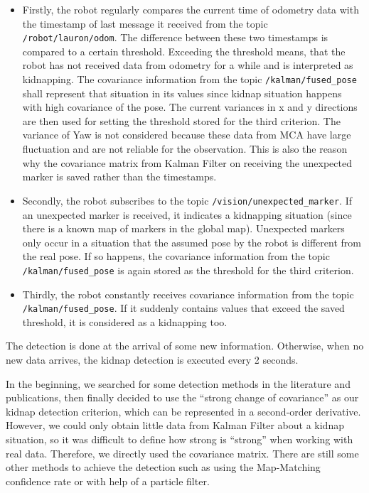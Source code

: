 \begin{itemize}
\item Firstly, the robot regularly compares the current time of odometry data with the timestamp of last message it received from the topic \texttt{/robot/lauron/odom}. The difference between these two timestamps is compared to a certain threshold. Exceeding the threshold means, that the robot has not received data from odometry for a while and is interpreted as kidnapping. The covariance information from the topic \texttt{/kalman/fused\_pose} shall represent that situation in its values since kidnap situation happens with high covariance of the pose. The current variances in x and y directions are then used for setting the threshold stored for the third criterion.
The variance of Yaw is not considered because these data from MCA have large fluctuation and are not reliable for the observation. This is also the reason why the covariance matrix from Kalman Filter on receiving the unexpected marker is saved rather than the timestamps.
\item Secondly, the robot subscribes to the topic \texttt{/vision/unexpected\_marker}. If an unexpected marker is received, it indicates a kidnapping situation (since there is a known map of markers in the global map). Unexpected markers only occur in a situation that the assumed pose by the robot is different from the real pose. If so happens, the covariance information from the topic \texttt{/kalman/fused\_pose} is again stored as the threshold for the third criterion.
\item Thirdly, the robot constantly receives covariance information from the topic
\\
\texttt{/kalman/fused\_pose}. If it suddenly contains values that exceed the saved threshold, it is considered as a kidnapping too.
\end{itemize}

The detection is done at the arrival of some new information. Otherwise, when no new data arrives, the kidnap detection is executed every 2 seconds.
 
In the beginning, we searched for some detection methods in the literature and publications, then finally decided to use the ``strong change of covariance'' as our kidnap detection criterion, which can be represented in a second-order derivative. However, we could only obtain little data from Kalman Filter about a kidnap situation, so it was difficult to define how strong is ``strong'' when working with real data. Therefore, we directly used the covariance matrix. There are still some other methods to achieve the detection such as using the Map-Matching confidence rate or with help of a particle filter.

